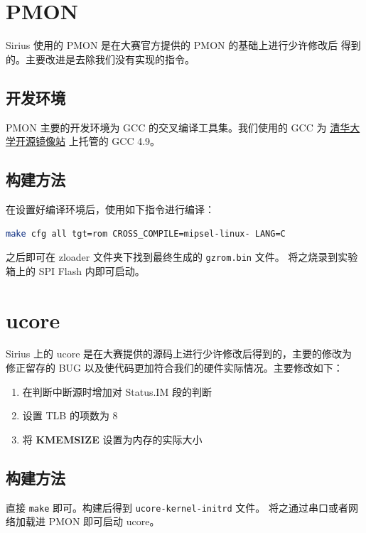 \documentclass[blue,normal,cn,hide]{elegantbook}
\begin{document}
\section{PMON}

Sirius 使用的 PMON 是在大赛官方提供的 PMON 的基础上进行少许修改后
得到的。主要改进是去除我们没有实现的指令。

\subsection{开发环境}

PMON 主要的开发环境为 GCC 的交叉编译工具集。我们使用的 GCC 为
\href{https://mirrors.tuna.tsinghua.edu.cn/}{清华大学开源镜像站}
上托管的 GCC 4.9。

\subsection{构建方法}

在设置好编译环境后，使用如下指令进行编译：

\begin{lstlisting}[language=bash]
	make cfg all tgt=rom CROSS_COMPILE=mipsel-linux- LANG=C
\end{lstlisting}

之后即可在 zloader 文件夹下找到最终生成的 \texttt{gzrom.bin} 文件。
将之烧录到实验箱上的 SPI Flash 内即可启动。

\section{ucore}

Sirius 上的 ucore 是在大赛提供的源码上进行少许修改后得到的，主要的修改为
修正留存的 BUG 以及使代码更加符合我们的硬件实际情况。主要修改如下：

\begin{enumerate}
    \item 在判断中断源时增加对 Status.IM 段的判断
    \item 设置 TLB 的项数为 8
    \item 将 \textbf{KMEMSIZE} 设置为内存的实际大小
\end{enumerate}

\subsection{构建方法}

直接 \texttt{make} 即可。构建后得到 \texttt{ucore-kernel-initrd} 文件。
将之通过串口或者网络加载进 PMON 即可启动 ucore。
\end{document}
